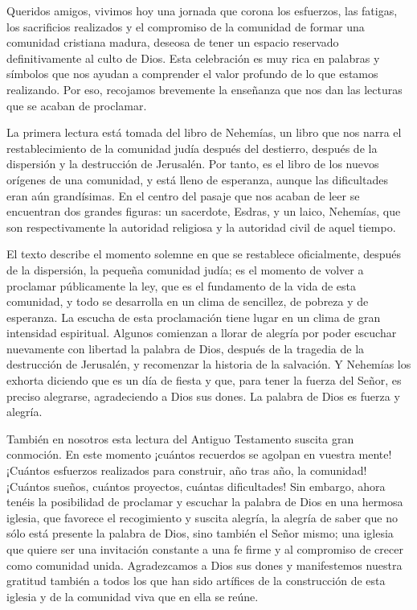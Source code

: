 \begin{body}
\begin{body}
Queridos amigos, vivimos hoy una jornada que corona los esfuerzos, las fatigas, los sacrificios realizados y el compromiso de la comunidad de formar una comunidad cristiana madura, deseosa de tener un espacio reservado definitivamente al culto de Dios. Esta celebración es muy rica en palabras y símbolos que nos ayudan a comprender el valor profundo de lo que estamos realizando. Por eso, recojamos brevemente la enseñanza que nos dan las lecturas que se acaban de proclamar.

La primera lectura está tomada del libro de Nehemías, un libro que nos narra el restablecimiento de la comunidad judía después del destierro, después de la dispersión y la destrucción de Jerusalén. Por tanto, es el libro de los nuevos orígenes de una comunidad, y está lleno de esperanza, aunque las dificultades eran aún grandísimas. En el centro del pasaje que nos acaban de leer se encuentran dos grandes figuras: un sacerdote, Esdras, y un laico, Nehemías, que son respectivamente la autoridad religiosa y la autoridad civil de aquel tiempo.

El texto describe el momento solemne en que se restablece oficialmente, después de la dispersión, la pequeña comunidad judía; es el momento de volver a proclamar públicamente la ley, que es el fundamento de la vida de esta comunidad, y todo se desarrolla en un clima de sencillez, de pobreza y de esperanza. La escucha de esta proclamación tiene lugar en un clima de gran intensidad espiritual. Algunos comienzan a llorar de alegría por poder escuchar nuevamente con libertad la palabra de Dios, después de la tragedia de la destrucción de Jerusalén, y recomenzar la historia de la salvación. Y Nehemías los exhorta diciendo que es un día de fiesta y que, para tener la fuerza del Señor, es preciso alegrarse, agradeciendo a Dios sus dones. La palabra de Dios es fuerza y alegría.

También en nosotros esta lectura del Antiguo Testamento suscita gran conmoción. En este momento ¡cuántos recuerdos se agolpan en vuestra mente! ¡Cuántos esfuerzos realizados para construir, año tras año, la comunidad! ¡Cuántos sueños, cuántos proyectos, cuántas dificultades! Sin embargo, ahora tenéis la posibilidad de proclamar y escuchar la palabra de Dios en una hermosa iglesia, que favorece el recogimiento y suscita alegría, la alegría de saber que no sólo está presente la palabra de Dios, sino también el Señor mismo; una iglesia que quiere ser una invitación constante a una fe firme y al compromiso de crecer como comunidad unida. Agradezcamos a Dios sus dones y manifestemos nuestra gratitud también a todos los que han sido artífices de la construcción de esta iglesia y de la comunidad viva que en ella se reúne.


\end{body}
\end{body}
